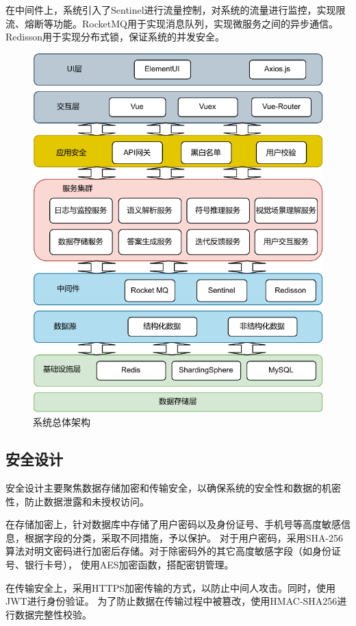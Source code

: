 在中间件上，系统引入了Sentinel进行流量控制，对系统的流量进行监控，实现限流、熔断等功能。RocketMQ用于实现消息队列，实现微服务之间的异步通信。
Redisson用于实现分布式锁，保证系统的并发安全。
\begin{figure}[h]
    \centering
    \includegraphics[scale=0.9]{figures/system_architecture-crop.pdf}
    \caption{系统总体架构}
    \label{fig:overall_architecture}
\end{figure}
\subsection{安全设计}
安全设计主要聚焦数据存储加密和传输安全，以确保系统的安全性和数据的机密性，防止数据泄露和未授权访问。

在存储加密上，针对数据库中存储了用户密码以及身份证号、手机号等高度敏感信息，根据字段的分类，采取不同措施，予以保护。
对于用户密码，采用SHA-256算法对明文密码进行加密后存储。对于除密码外的其它高度敏感字段（如身份证号、银行卡号），
使用AES加密函数，搭配密钥管理。

在传输安全上，采用HTTPS加密传输的方式，以防止中间人攻击。同时，使用JWT进行身份验证。
为了防止数据在传输过程中被篡改，使用HMAC-SHA256进行数据完整性校验。

